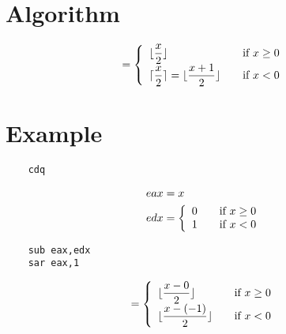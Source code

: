\documentclass[fleqn]{article}
\DeclarePairedDelimiter\ceil{\lceil}{\rceil}
\DeclarePairedDelimiter\floor{\lfloor}{\rfloor}
\begin{document}

\section{Algorithm}
\begin{equation*}
    [\frac{x}{2}] = \left\{
        \begin{array}{l l}
            \floor{\dfrac{x}{2}} & \quad \text{if $x \ge 0$} \\
            \ceil{\dfrac{x}{2}} = \floor{\dfrac{x + 1}{2}} & \quad \text{if $x < 0$}
        \end{array}
    \right.
\end{equation*}

\section{Example}
\begin{lstlisting}
    cdq
\end{lstlisting}
\begin{align*}
    eax &= x \\
    edx &= \left\{
        \begin{array}{l l}
            0 & \quad \text{if $x \ge 0$} \\
            1 & \quad \text{if $x < 0$}
        \end{array}
    \right.
\end{align*}

\begin{lstlisting}
    sub eax,edx
    sar eax,1
\end{lstlisting}
\begin{equation*}
    [\dfrac{x}{2}] = \left\{
        \begin{array}{l l}
            \floor{\dfrac{x - 0}{2}} & \quad \text{if $x \ge 0$} \\
            \floor{\dfrac{x - (-1)}{2}} & \quad \text{if $x < 0$}
        \end{array}
    \right.
\end{equation*}
\end{document}
